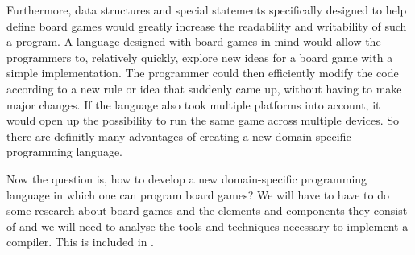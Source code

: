 Furthermore, data structures and special statements specifically designed to help define board games would greatly increase the readability and writability of such a program. A language designed with board games in mind would allow the programmers to, relatively quickly, explore new ideas for a board game with a simple implementation. The programmer could then efficiently modify the code according to a new rule or idea that suddenly came up, without having to make major changes. If the language also took multiple platforms into account, it would open up the possibility to run the same game across multiple devices. So there are definitly many advantages of creating a new domain-specific programming language. 

Now the question is, how to develop a new domain-specific programming language in which one can program board games? We will have to have to do some research about board games and the elements and components they consist of and we will need to analyse the tools and techniques necessary to implement a compiler. This is included in .

%
%
